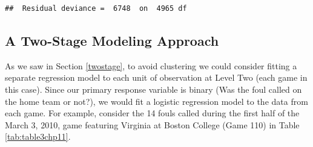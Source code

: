 \documentclass[
]{krantz}
\begin{document}
\begin{verbatim}
##  Residual deviance =  6748  on  4965 df
\end{verbatim}

\subsection{A Two-Stage Modeling Approach}\label{twostage-glmm}

As we saw in Section \ref{twostage}, to avoid clustering we could consider fitting a separate regression model to each unit of observation at Level Two (each game in this case). Since our primary response variable is binary (Was the foul called on the home team or not?), we would fit a logistic regression model to the data from each game. For example, consider the 14 fouls called during the first half of the March 3, 2010, game featuring Virginia at Boston College (Game 110) in Table \ref{tab:table3chp11}.

\begin{table}
\centering
\caption{\label{tab:table3chp11}Key variables from the March 3, 2010, game featuring Virginia at Boston College (Game 110).}
\centering
{}
\end{table}
\end{document}
